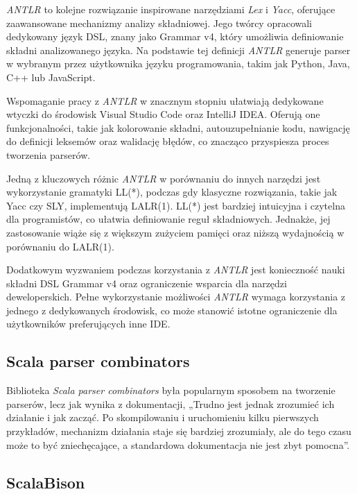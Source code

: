 \textit{ANTLR}\cite{parr2004s} to kolejne rozwiązanie inspirowane narzędziami \textit{Lex} i \textit{Yacc}, oferujące zaawansowane mechanizmy analizy składniowej.
Jego twórcy opracowali dedykowany język DSL, znany jako Grammar v4, który umożliwia definiowanie składni analizowanego języka.
Na podstawie tej definicji \textit{ANTLR} generuje parser w wybranym przez użytkownika języku programowania, takim jak Python, Java, C++ lub JavaScript.

Wspomaganie pracy z \textit{ANTLR} w znacznym stopniu ułatwiają dedykowane wtyczki do środowisk Visual Studio Code oraz IntelliJ IDEA. Oferują one funkcjonalności, takie jak kolorowanie składni, autouzupełnianie kodu, nawigację do definicji leksemów oraz walidację błędów, co znacząco przyspiesza proces tworzenia parserów.

Jedną z kluczowych różnic \textit{ANTLR} w porównaniu do innych narzędzi jest wykorzystanie gramatyki LL(*), podczas gdy klasyczne rozwiązania, takie jak Yacc czy SLY, implementują LALR(1).
LL(*) jest bardziej intuicyjna i czytelna dla programistów, co ułatwia definiowanie reguł składniowych.
Jednakże, jej zastosowanie wiąże się z większym zużyciem pamięci oraz niższą wydajnością w porównaniu do LALR(1).

Dodatkowym wyzwaniem podczas korzystania z \textit{ANTLR} jest konieczność nauki składni DSL Grammar v4 oraz ograniczenie wsparcia dla narzędzi deweloperskich.
Pełne wykorzystanie możliwości \textit{ANTLR} wymaga korzystania z jednego z dedykowanych środowisk, co może stanowić istotne ograniczenie dla użytkowników preferujących inne IDE\@.

\subsection{Scala parser combinators}
\label{subsec:scala-parser-combinators}

Biblioteka \textit{Scala parser combinators}\cite{moors2008parser} była popularnym sposobem na tworzenie parserów, lecz jak wynika z dokumentacji, „Trudno jest jednak zrozumieć ich działanie i jak zacząć.
Po skompilowaniu i uruchomieniu kilku pierwszych przykładów, mechanizm działania staje się bardziej zrozumiały, ale do tego czasu może to być zniechęcające, a standardowa dokumentacja nie jest zbyt pomocna”\cite{parser-combinators-readme}.

\subsection{ScalaBison}
\label{subsec:scala-bison}

